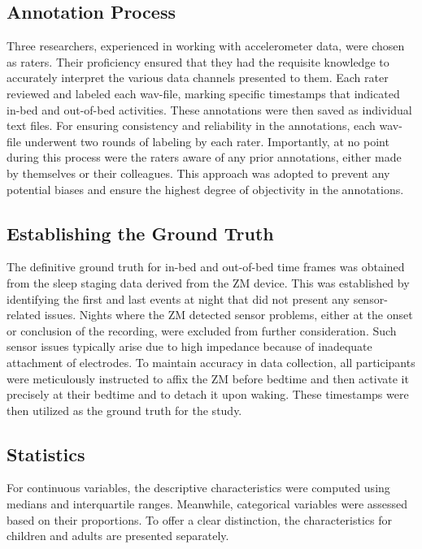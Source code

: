 \documentclass[
  10pt,
]{scrbook}
\begin{document}
\hypertarget{annotation-process}{%
\subsection{Annotation Process}\label{annotation-process}}

Three researchers, experienced in working with accelerometer data, were
chosen as raters. Their proficiency ensured that they had the requisite
knowledge to accurately interpret the various data channels presented to
them. Each rater reviewed and labeled each wav-file, marking specific
timestamps that indicated in-bed and out-of-bed activities. These
annotations were then saved as individual text files. For ensuring
consistency and reliability in the annotations, each wav-file underwent
two rounds of labeling by each rater. Importantly, at no point during
this process were the raters aware of any prior annotations, either made
by themselves or their colleagues. This approach was adopted to prevent
any potential biases and ensure the highest degree of objectivity in the
annotations.

\hypertarget{establishing-the-ground-truth}{%
\subsection{Establishing the Ground
Truth}\label{establishing-the-ground-truth}}

The definitive ground truth for in-bed and out-of-bed time frames was
obtained from the sleep staging data derived from the ZM device. This
was established by identifying the first and last events at night that
did not present any sensor-related issues. Nights where the ZM detected
sensor problems, either at the onset or conclusion of the recording,
were excluded from further consideration. Such sensor issues typically
arise due to high impedance because of inadequate attachment of
electrodes. To maintain accuracy in data collection, all participants
were meticulously instructed to affix the ZM before bedtime and then
activate it precisely at their bedtime and to detach it upon waking.
These timestamps were then utilized as the ground truth for the study.

\hypertarget{statistics}{%
\subsection{Statistics}\label{statistics}}

For continuous variables, the descriptive characteristics were computed
using medians and interquartile ranges. Meanwhile, categorical variables
were assessed based on their proportions. To offer a clear distinction,
the characteristics for children and adults are presented separately.
\end{document}
